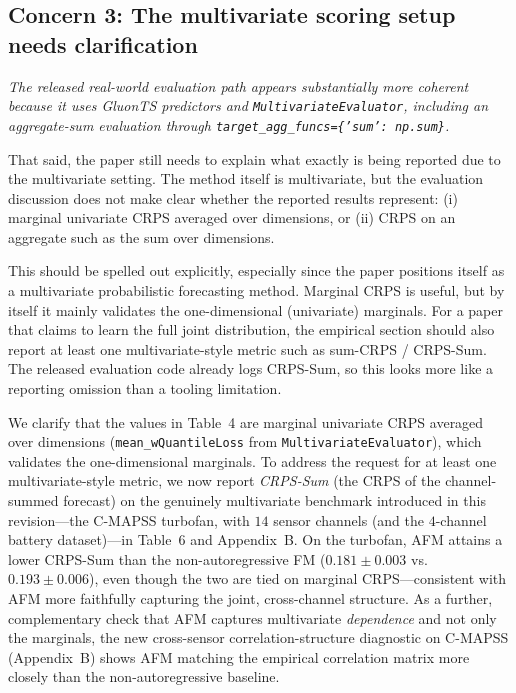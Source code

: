 \documentclass[11pt]{article}
\newcommand{\reviewertext}[1]{%
  \begin{reviewerquote}
    {\color{reviewercolor}\itshape #1}
  \end{reviewerquote}%
}
\newcommand{\authorresponse}[1]{%
    #1\par\medskip
}
\begin{document}
\subsection{Concern 3: The multivariate scoring setup needs clarification}

\reviewertext{%
The released real-world evaluation path appears substantially more coherent because it uses GluonTS predictors and \texttt{MultivariateEvaluator}, including an aggregate-sum evaluation through \texttt{target\_agg\_funcs=\{'sum': np.sum\}}.

That said, the paper still needs to explain what exactly is being reported due to the multivariate setting. The method itself is multivariate, but the evaluation discussion does not make clear whether the reported results represent: (i) marginal univariate CRPS averaged over dimensions, or (ii) CRPS on an aggregate such as the sum over dimensions.

This should be spelled out explicitly, especially since the paper positions itself as a multivariate probabilistic forecasting method. Marginal CRPS is useful, but by itself it mainly validates the one-dimensional (univariate) marginals. For a paper that claims to learn the full joint distribution, the empirical section should also report at least one multivariate-style metric such as sum-CRPS / CRPS-Sum. The released evaluation code already logs CRPS-Sum, so this looks more like a reporting omission than a tooling limitation.
}

\authorresponse{%
We clarify that the values in Table~4 are marginal univariate CRPS averaged over dimensions (\texttt{mean\_wQuantileLoss} from \texttt{MultivariateEvaluator}), which validates the one-dimensional marginals. To address the request for at least one multivariate-style metric, we now report \emph{CRPS-Sum} (the CRPS of the channel-summed forecast) on the genuinely multivariate benchmark introduced in this revision---the C-MAPSS turbofan, with $14$ sensor channels (and the $4$-channel battery dataset)---in Table~6 and Appendix~B. On the turbofan, AFM attains a lower CRPS-Sum than the non-autoregressive FM ($0.181\!\pm\!0.003$ vs.\ $0.193\!\pm\!0.006$), even though the two are tied on marginal CRPS---consistent with AFM more faithfully capturing the joint, cross-channel structure. As a further, complementary check that AFM captures multivariate \emph{dependence} and not only the marginals, the new cross-sensor correlation-structure diagnostic on C-MAPSS (Appendix~B) shows AFM matching the empirical correlation matrix more closely than the non-autoregressive baseline.
}
\end{document}
